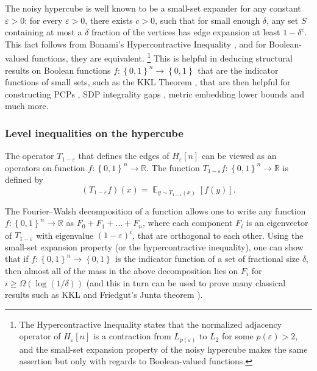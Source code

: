 \documentclass[11pt]{article}
\newcommand\set[1]{{\left\{ #1 \right\}}}
\newcommand\Expect[2]{{\mathop{\mathbb{E}}_{#1}\left[ {#2} \right]}}
\newcommand\power[1]{\set{0,1}^{#1}}
\newcommand\eps{\varepsilon}
\renewcommand\geq{\geqslant}
\begin{document}
The noisy hypercube is well known to be a small-set expander for any constant
$\eps>0$: for every $\eps>0$, there exists
$c>0$, such that for small enough $\delta$, any set $S$ containing at most
a  %
$\delta$ fraction of the vertices has edge
expansion at least $1-\delta^c$. This fact
%
follows from  %
%
%
%
Bonami's   %
Hypercontractive Inequality
%
%
\cite{Bonami,Beckner,Gross},   %
and %
%
for Boolean-valued functions, they are equivalent.%
%
%
%
\footnote{%
The Hypercontractive Inequality states that the normalized adjacency operator
of $H_{\eps}[n]$ is a contraction from $L_{p(\eps)}$ to $L_2$ for some $p(\eps)>2$,
and the small-set expansion property
of the noisy hypercube  %
makes the same assertion but only with regards
to Boolean-valued functions.%
%
%
} This is helpful in deducing
structural results on Boolean %
functions   %
$f\colon\power{n}\to\power{}$ that are
the indicator functions of small sets, such as the KKL Theorem \cite{KKL},
that are then helpful for constructing PCPs \cite{Has01,DS05,KKMO07,DinurMosselRegev},
SDP integrality gaps \cite{FS2002,Rag2008}, metric embedding lower
bounds \cite{KhotVishnoi,KN} and much more.


%
%
\subsubsection{Level inequalities on the hypercube}   %
The operator $T_{1-\eps}$ that defines the edges of $H_{\eps}[n]$ can be viewed as an operators on function $f\colon\power{n}\to\mathbb{R}$.
The function $T_{1-\eps} f\colon \power{n}\to\mathbb{R}$ is defined by
\[
(T_{1-\eps} f)(x) = \Expect{y\sim T_{1-\eps}(x)}{f(y)}.
\]

The Fourier--Walsh decomposition of a function allows one to write any function $f\colon \power{n}\to\mathbb{R}$
as $F_0+F_1+\ldots+F_n$, where each component $F_i$ is an eigenvector of $T_{1-\eps}$ with eigenvalue $(1-\eps)^i$, that are orthogonal to each other.
Using the small-set expansion property (or the hypercontractive inequality), one can show that if $f\colon \power{n}\to\power{}$ is the
indicator function of a set of fractional size $\delta$, then almost all of the mass in the above decomposition lies on $F_i$ for $i\geq \Omega(\log(1/\delta))$
(and this in turn can be used to prove many classical results such as KKL and Friedgut's Junta theorem \cite{KKL,Friedgut98}).
\end{document}
